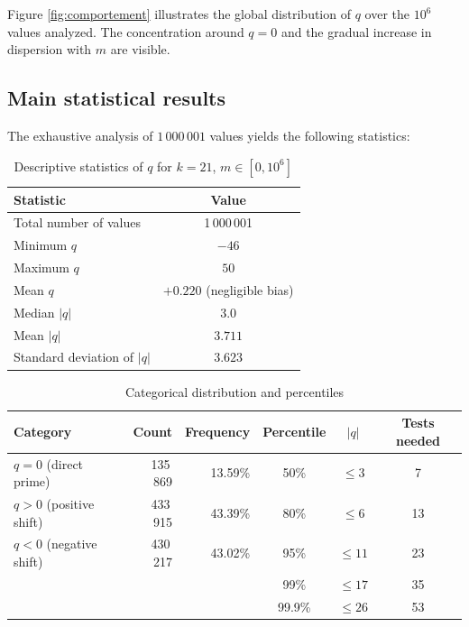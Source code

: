 \documentclass[11pt,a4paper]{article}
\theoremstyle{definition}
\theoremstyle{plain}
\def\textbf#1{#1}%
\begin{document}
Figure \ref{fig:comportement} illustrates the global distribution of $q$ over the $10^6$ values analyzed. The concentration around $q=0$ and the gradual increase in dispersion with $m$ are visible.

\subsection{Main statistical results}

The exhaustive analysis of $1\,000\,001$ values yields the following statistics:

\begin{table}[htbp]
\centering
\caption{Descriptive statistics of $q$ for $k=21$, $m \in [0, 10^6]$}\label{tab:stats-k21}
\begin{tabular}{@{}lc@{}}
\toprule
\textbf{Statistic} & \textbf{Value} \\
\midrule
Total number of values & 1\,000\,001 \\
Minimum $q$ & $-46$ \\
Maximum $q$ & $50$ \\
Mean $q$ & $+0.220$ (negligible bias) \\
\textbf{Median $|q|$} & $\mathbf{3.0}$ \\
Mean $|q|$ & $3.711$ \\
Standard deviation of $|q|$ & $3.623$ \\
\bottomrule
\end{tabular}
\end{table}

\begin{table}[htbp]
\centering
\caption{Categorical distribution and percentiles}\label{tab:percentiles}
\begin{tabular}{@{}lrr|ccc@{}}
\toprule
\textbf{Category} & \textbf{Count} & \textbf{Frequency} & \textbf{Percentile} & $|q|$ & \textbf{Tests needed} \\
\midrule
$q = 0$ (direct prime) & 135\,869 & 13.59\% & 50\% & $\leq 3$ & 7 \\
$q > 0$ (positive shift) & 433\,915 & 43.39\% & 80\% & $\leq 6$ & 13 \\
$q < 0$ (negative shift) & 430\,217 & 43.02\% & 95\% & $\leq 11$ & 23 \\
\midrule
& & & 99\% & $\leq 17$ & 35 \\
& & & 99.9\% & $\leq 26$ & 53 \\
\bottomrule
\end{tabular}
\end{table}
\end{document}
